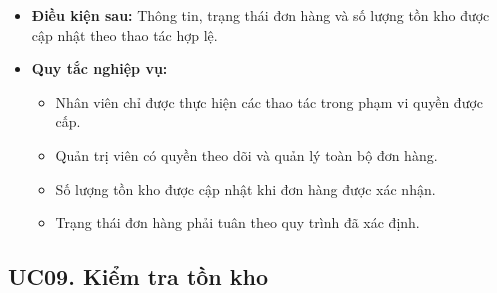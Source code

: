 \documentclass[12pt,a4paper]{article}
\begin{document}
\begin{itemize}
    \item \textbf{Điều kiện sau:} Thông tin, trạng thái đơn hàng và số lượng tồn kho được cập nhật theo thao tác hợp lệ.

    \item \textbf{Quy tắc nghiệp vụ:}
    \begin{itemize}
        \item Nhân viên chỉ được thực hiện các thao tác trong phạm vi quyền được cấp.
        \item Quản trị viên có quyền theo dõi và quản lý toàn bộ đơn hàng.
        \item Số lượng tồn kho được cập nhật khi đơn hàng được xác nhận.
        \item Trạng thái đơn hàng phải tuân theo quy trình đã xác định.
    \end{itemize}

\end{itemize}

\subsection*{UC09. Kiểm tra tồn kho}
\end{document}
